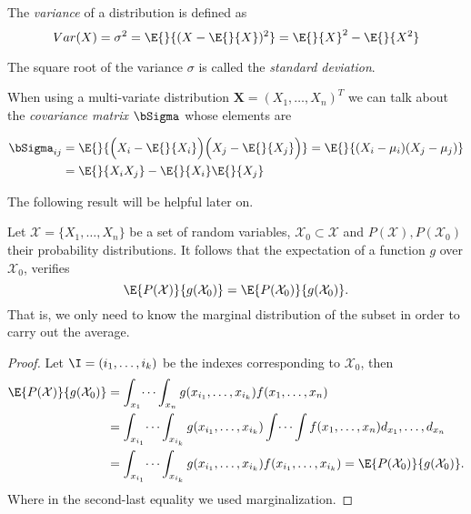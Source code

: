 \begin{definition}
  The \emph{variance} of a distribution is defined as
  \[
    Var(X) = \sigma^2 = \E{}{(X - \E{}{X})^2} = \E{}{X}^2 - \E{}{X^2}
  \]

  The square root of the variance \(\sigma\) is called the \emph{standard deviation}.
\end{definition}

When using a multi-variate distribution \(\bm{X} = (X_1,\dots,X_n)^T\) we can talk about the \emph{covariance
  matrix} \(\bSigma \) whose elements are

\[
\begin{aligned}
\bSigma_{ij} &= \E{}{\Big(X_i - \E{}{X_i}\Big)
  \Big(X_j - \E{}{X_j}\Big)} = \E{}{(X_i - \mu_i)(X_j - \mu_j)}\\
&=\E{}{X_i X_j}-\E{}{X_i}\E{}{X_j}
\end{aligned}
\]

The following result will be helpful later on.

\begin{proposition} \label{prop:expectation_over_marginal}
  Let \(\mathcal{X} = \{X_1,\dots,X_n\}\) be a set of random variables,
  \(\mathcal{X}_{0} \subset \mathcal{X}\) and \(P(\mathcal{X}), P(\mathcal{X}_{0})\)
  their probability distributions.
  It follows that the expectation of a function \(g\) over \(\mathcal{X}_0\), verifies
    \[
      \E{P(\mathcal{X})}{g(\mathcal{X}_0)} = \E{P(\mathcal{X}_0)}{g(\mathcal{X}_0)}.
    \]
    That is, we only need to know the marginal distribution of the subset in
    order to carry out the average.
\end{proposition}

\begin{proof}
  Let \(\I = (i_{1}, \dots, i_{k})\) be the indexes corresponding to \(\mathcal{X}_{0}\), then
  \[
    \begin{aligned}
      \E{P(\mathcal{X})}{g(\mathcal{X}_{0})}&= \int_{x_{1}}\dots\int_{x_{n}}g(x_{i_{1}},\dots,x_{i_{k}})f(x_{1},\dots,x_{n}) \\
      &= \int_{x_{i_{1}}}\dots\int_{x_{i_{k}}} g(x_{i_{1}},\dots,x_{i_{k}}) \int \dots \int f(x_{1},\dots,x_{n}) d_{x_{1}},\dots,d_{x_{n}}\\
      &= \int_{x_{i_{1}}}\dots\int_{x_{i_{k}}} g(x_{i_{1}},\dots,x_{i_{k}}) f(x_{i_{1}},\dots,x_{i_{k}}) =  \E{P(\mathcal{X}_{0})}{g(\mathcal{X}_{0})}.\\
      \end{aligned}
  \]
Where in the second-last equality we used marginalization.
\end{proof}

